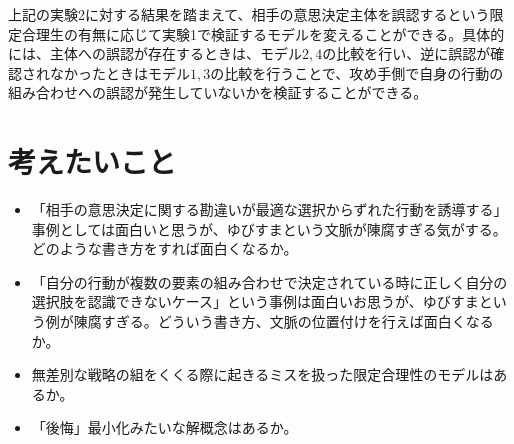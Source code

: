 \documentclass{jsarticle}
\begin{document}
上記の実験2に対する結果を踏まえて、相手の意思決定主体を誤認するという限定合理生の有無に応じて実験1で検証するモデルを変えることができる。具体的には、主体への誤認が存在するときは、モデル$2,4$の比較を行い、逆に誤認が確認されなかったときはモデル$1,3$の比較を行うことで、攻め手側で自身の行動の組み合わせへの誤認が発生していないかを検証することができる。






\section{考えたいこと}
\begin{itemize}
	\item 「相手の意思決定に関する勘違いが最適な選択からずれた行動を誘導する」事例としては面白いと思うが、ゆびすまという文脈が陳腐すぎる気がする。どのような書き方をすれば面白くなるか。
	\item 「自分の行動が複数の要素の組み合わせで決定されている時に正しく自分の選択肢を認識できないケース」という事例は面白いお思うが、ゆびすまという例が陳腐すぎる。どういう書き方、文脈の位置付けを行えば面白くなるか。
	\item 無差別な戦略の組をくくる際に起きるミスを扱った限定合理性のモデルはあるか。
	\item 「後悔」最小化みたいな解概念はあるか。
\end{itemize}
\end{document}

